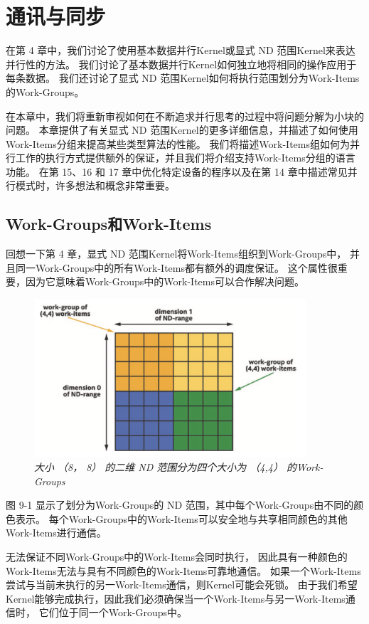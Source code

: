 \section{通讯与同步}
在第 4 章中，我们讨论了使用基本数据并行Kernel或显式 ND 范围Kernel来表达并行性的方法。 
我们讨论了基本数据并行Kernel如何独立地将相同的操作应用于每条数据。 
我们还讨论了显式 ND 范围Kernel如何将执行范围划分为Work-Items的Work-Groups。

在本章中，我们将重新审视如何在不断追求并行思考的过程中将问题分解为小块的问题。 
本章提供了有关显式 ND 范围Kernel的更多详细信息，并描述了如何使用Work-Items分组来提高某些类型算法的性能。 
我们将描述Work-Items组如何为并行工作的执行方式提供额外的保证，并且我们将介绍支持Work-Items分组的语言功能。 
在第 15、16 和 17 章中优化特定设备的程序以及在第 14 章中描述常见并行模式时，许多想法和概念非常重要。

\subsection{Work-Groups和Work-Items}
回想一下第 4 章，显式 ND 范围Kernel将Work-Items组织到Work-Groups中，
并且同一Work-Groups中的所有Work-Items都有额外的调度保证。 
这个属性很重要，因为它意味着Work-Groups中的Work-Items可以合作解决问题。

\begin{figure}[H]
	\centering
	\includegraphics[width=0.9\textwidth]{figs/F9.1.png}
	\caption{\textit{大小 （8， 8） 的二维 ND 范围分为四个大小为 （4,4） 的Work-Groups }}
\end{figure}

图 9-1 显示了划分为Work-Groups的 ND 范围，其中每个Work-Groups由不同的颜色表示。 
每个Work-Groups中的Work-Items可以安全地与共享相同颜色的其他Work-Items进行通信。

无法保证不同Work-Groups中的Work-Items会同时执行，
因此具有一种颜色的Work-Items无法与具有不同颜色的Work-Items可靠地通信。 
如果一个Work-Items尝试与当前未执行的另一Work-Items通信，则Kernel可能会死锁。 
由于我们希望Kernel能够完成执行，因此我们必须确保当一个Work-Items与另一Work-Items通信时，
它们位于同一个Work-Groups中。

